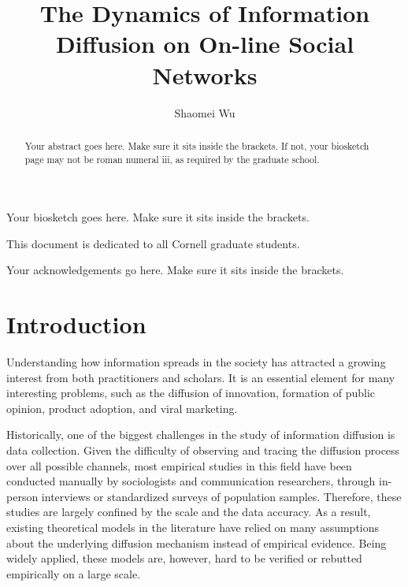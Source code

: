 \documentclass[phd,tocprelim]{cornell}
\title {The Dynamics of Information Diffusion on On-line Social Networks}
\author {Shaomei Wu}
\begin{document}
\maketitle
\makecopyright

\begin{abstract}
Your abstract goes here. Make sure it sits inside the brackets. If not,
your biosketch page may not be roman numeral iii, as required by the
graduate school.
\end{abstract}

\begin{biosketch}
Your biosketch goes here. Make sure it sits inside
the brackets.
\end{biosketch}

\begin{dedication}
This document is dedicated to all Cornell graduate students.
\end{dedication}

\begin{acknowledgements}
Your acknowledgements go here. Make sure it sits inside the brackets.
\end{acknowledgements}

\contentspage
\tablelistpage
\figurelistpage

\normalspacing \setcounter{page}{1} 
\pagestyle{cornell} \addtolength{\parskip}{0.5\baselineskip}

\chapter{Introduction}
Understanding how information spreads in the society has attracted a growing interest from both practitioners and scholars. It is an essential element for many interesting problems, such as the diffusion of innovation, formation of public opinion, product adoption, and viral marketing. 

Historically, one of the biggest challenges in the study of information diffusion is data collection. Given the difficulty of observing and tracing the diffusion process over all possible channels, most empirical studies in this field have been conducted manually by sociologists and communication researchers, through in-person interviews or standardized surveys of population samples. Therefore, these studies are largely confined by the scale and the data accuracy. As a result, existing theoretical models in the literature have relied on many assumptions about the underlying diffusion mechanism instead of empirical evidence. Being widely applied, these models are, however, hard to be verified or rebutted empirically on a large scale. 
\end{document}
